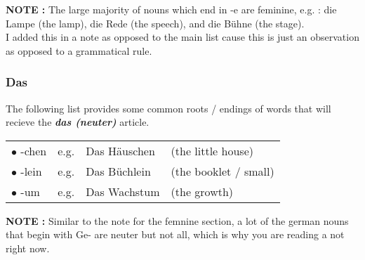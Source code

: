 \documentclass[a4paper,12pt]{article}
\begin{document}
\begin{adjustwidth}{3em}{0pt}
\begin{note-background}

\color{flame} \textbf {NOTE :} \color{black} The large majority of nouns which
end in -e are feminine, e.g. : die Lampe (the lamp), die Rede (the speech), and die
Bühne (the stage).\\
\vspace{0.25cm}
I added this in a note as opposed to the main list cause this is just an
observation as opposed to a grammatical rule.\\

\end{note-background}

\end{adjustwidth}

\subsubsection{\bf{Das}}
\begin{adjustwidth}{3em}{0pt}
\label{sec:das}


The following list provides some common roots / endings of words that will
recieve the \textbf{\textit{das (neuter)}} article.



\vspace{0.3cm}
\begin{tabular}{l r l l}

\rowcolor{white} $\bullet$ -chen & e.g. & Das Häuschen & (the little house)\\
\rowcolor{white} $\bullet$ -lein & e.g. & Das Büchlein & (the booklet / small)\\
\rowcolor{white} $\bullet$ -um & e.g. & Das Wachstum & (the growth) \\

\end{tabular}
\vspace{0.3cm}
\newline



\begin{note-background}

\color{flame} \textbf {NOTE :} \color{black} Similar to the note for the femnine
section, a lot of the german nouns that begin with Ge- are neuter but not all,
which is why you are reading a not right now.

\end{note-background}

\end{adjustwidth}
\end{document}
